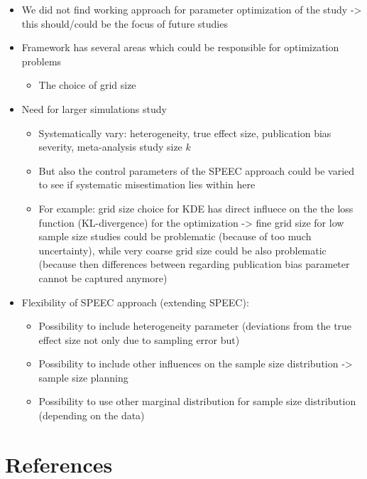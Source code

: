 \documentclass[
  12pt,
]{scrartcl}
\providecommand{\tightlist}{%
  \setlength{\itemsep}{0pt}\setlength{\parskip}{0pt}}\usepackage{longtable,booktabs,array}
\begin{document}
\begin{itemize}
\tightlist
\item
  We did not find working approach for parameter optimization of the
  study -\textgreater{} this should/could be the focus of future studies
\item
  Framework has several areas which could be responsible for
  optimization problems

  \begin{itemize}
  \tightlist
  \item
    The choice of grid size
  \end{itemize}
\item
  Need for larger simulations study

  \begin{itemize}
  \tightlist
  \item
    Systematically vary: heterogeneity, true effect size, publication
    bias severity, meta-analysis study size \(k\)
  \item
    But also the control parameters of the SPEEC approach could be
    varied to see if systematic misestimation lies within here
  \item
    For example: grid size choice for KDE has direct influece on the the
    loss function (KL-divergence) for the optimization -\textgreater{}
    fine grid size for low sample size studies could be problematic
    (because of too much uncertainty), while very coarse grid size could
    be also problematic (because then differences between regarding
    publication bias parameter cannot be captured anymore)
  \end{itemize}
\item
  Flexibility of SPEEC approach (extending SPEEC):

  \begin{itemize}
  \tightlist
  \item
    Possibility to include heterogeneity parameter (deviations from the
    true effect size not only due to sampling error but)
  \item
    Possibility to include other influences on the sample size
    distribution -\textgreater{} sample size planning
  \item
    Possibility to use other marginal distribution for sample size
    distribution (depending on the data)
  \end{itemize}
\end{itemize}

\newpage

\section{References}\label{references}
\end{document}
